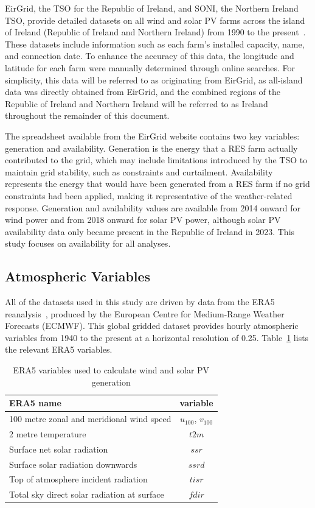 \documentclass[preprint, 12pt]{elsarticle}
\begin{document}
EirGrid, the TSO for the Republic of Ireland, and SONI, the Northern Ireland TSO, provide detailed datasets on all wind and solar PV farms across the island of Ireland (Republic of Ireland and Northern Ireland) from 1990 to the present~\citep{eirgrid2023spreadsheet}. These datasets include information such as each farm’s installed capacity, name, and connection date. To enhance the accuracy of this data, the longitude and latitude for each farm were manually determined through online searches. For simplicity, this data will be referred to as originating from EirGrid, as all-island data was directly obtained from EirGrid, and the combined regions of the Republic of Ireland and Northern Ireland will be referred to as Ireland throughout the remainder of this document.

The spreadsheet available from the EirGrid website contains two key variables: generation and availability. Generation is the energy that a RES farm actually contributed to the grid, which may include limitations introduced by the TSO to maintain grid stability, such as constraints and curtailment. Availability represents the energy that would have been generated from a RES farm if no grid constraints had been applied, making it representative of the weather-related response. Generation and availability values are available from 2014 onward for wind power and from 2018 onward for solar PV power, although solar PV availability data only became present in the Republic of Ireland in 2023. This study focuses on availability for all analyses.

\subsection{Atmospheric Variables}
\label{sec:era5}

All of the datasets used in this study are driven by data from the ERA5 reanalysis~\citep{hersbach2020era5}, produced by the European Centre for Medium-Range Weather Forecasts (ECMWF). This global gridded dataset provides hourly atmospheric variables from 1940 to the present at a horizontal resolution of 0.25\textdegree. Table~\ref{tab:var_name} lists the relevant ERA5 variables.

\begin{table}[h!]
	\centering
	\caption{ERA5 variables used to calculate wind and solar PV generation}
	\begin{tabular}{|l|c|}
		\hline
		{\textbf{ERA5 name}}      & \textbf{variable} \\ \hline
		100 metre zonal and meridional wind speed   & $u_{100}$, $v_{100}$ \\
		2 metre temperature                         & $t2m$ \\
		Surface net solar radiation                 & $ssr$ \\
		Surface solar radiation downwards           & $ssrd$  \\
		Top of atmosphere incident radiation        & $tisr$  \\
		Total sky direct solar radiation at surface & $fdir$  \\ \hline
	\end{tabular}
	\label{tab:var_name}
\end{table}
\end{document}
